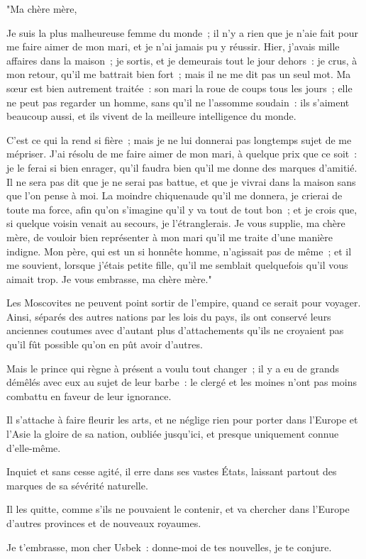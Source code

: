 \documentclass[french,twoside]{book} %
\begin{document}
"Ma chère mère,\par
Je suis la plus malheureuse femme du monde ; il n’y a rien que je n’aie fait pour me faire aimer de mon mari, et je n’ai jamais pu y réussir. Hier, j’avais mille affaires dans la maison ; je sortis, et je demeurais tout le jour dehors : je crus, à mon retour, qu’il me battrait bien fort ; mais il ne me dit pas un seul mot. Ma sœur est bien autrement traitée : son mari la roue de coups tous les jours ; elle ne peut pas regarder un homme, sans qu’il ne l’assomme soudain : ils s’aiment beaucoup aussi, et ils vivent de la meilleure intelligence du monde.\par
C’est ce qui la rend si fière ; mais je ne lui donnerai pas longtemps sujet de me mépriser. J’ai résolu de me faire aimer de mon mari, à quelque prix que ce soit : je le ferai si bien enrager, qu’il faudra bien qu’il me donne des marques d’amitié. Il ne sera pas dit que je ne serai pas battue, et que je vivrai dans la maison sans que l’on pense à moi. La moindre chiquenaude qu’il me donnera, je crierai de toute ma force, afin qu’on s’imagine qu’il y va tout de tout bon ; et je crois que, si quelque voisin venait au secours, je l’étranglerais. Je vous supplie, ma chère mère, de vouloir bien représenter à mon mari qu’il me traite d’une manière indigne. Mon père, qui est un si honnête homme, n’agissait pas de même ; et il me souvient, lorsque j’étais petite fille, qu’il me semblait quelquefois qu’il vous aimait trop. Je vous embrasse, ma chère mère."\par
Les Moscovites ne peuvent point sortir de l’empire, quand ce serait pour voyager. Ainsi, séparés des autres nations par les lois du pays, ils ont conservé leurs anciennes coutumes avec d’autant plus d’attachements qu’ils ne croyaient pas qu’il fût possible qu’on en pût avoir d’autres.\par
Mais le prince qui règne à présent a voulu tout changer ; il y a eu de grands démêlés avec eux au sujet de leur barbe : le clergé et les moines n’ont pas moins combattu en faveur de leur ignorance.\par
Il s’attache à faire fleurir les arts, et ne néglige rien pour porter dans l’Europe et l’Asie la gloire de sa nation, oubliée jusqu’ici, et presque uniquement connue d’elle-même.\par
Inquiet et sans cesse agité, il erre dans ses vastes États, laissant partout des marques de sa sévérité naturelle.\par
Il les quitte, comme s’ils ne pouvaient le contenir, et va chercher dans l’Europe d’autres provinces et de nouveaux royaumes.\par
Je t’embrasse, mon cher Usbek : donne-moi de tes nouvelles, je te conjure.\par
\end{document}
